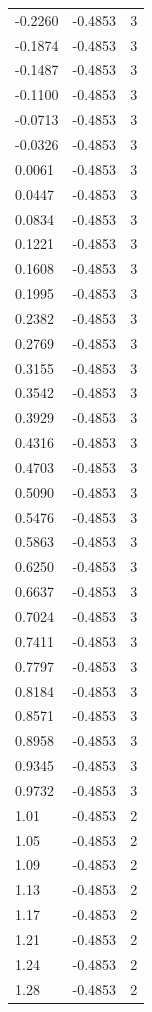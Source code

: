\begin{longtable}{lrr}
  -0.2260 & -0.4853 & 3 \\
  -0.1874 & -0.4853 & 3 \\
  -0.1487 & -0.4853 & 3 \\
  -0.1100 & -0.4853 & 3 \\
  -0.0713 & -0.4853 & 3 \\
  -0.0326 & -0.4853 & 3 \\
  0.0061 & -0.4853 & 3 \\
  0.0447 & -0.4853 & 3 \\
  0.0834 & -0.4853 & 3 \\
  0.1221 & -0.4853 & 3 \\
  0.1608 & -0.4853 & 3 \\
  0.1995 & -0.4853 & 3 \\
  0.2382 & -0.4853 & 3 \\
  0.2769 & -0.4853 & 3 \\
  0.3155 & -0.4853 & 3 \\
  0.3542 & -0.4853 & 3 \\
  0.3929 & -0.4853 & 3 \\
  0.4316 & -0.4853 & 3 \\
  0.4703 & -0.4853 & 3 \\
  0.5090 & -0.4853 & 3 \\
  0.5476 & -0.4853 & 3 \\
  0.5863 & -0.4853 & 3 \\
  0.6250 & -0.4853 & 3 \\
  0.6637 & -0.4853 & 3 \\
  0.7024 & -0.4853 & 3 \\
  0.7411 & -0.4853 & 3 \\
  0.7797 & -0.4853 & 3 \\
  0.8184 & -0.4853 & 3 \\
  0.8571 & -0.4853 & 3 \\
  0.8958 & -0.4853 & 3 \\
  0.9345 & -0.4853 & 3 \\
  0.9732 & -0.4853 & 3 \\
  1.01 & -0.4853 & 2 \\
  1.05 & -0.4853 & 2 \\
  1.09 & -0.4853 & 2 \\
  1.13 & -0.4853 & 2 \\
  1.17 & -0.4853 & 2 \\
  1.21 & -0.4853 & 2 \\
  1.24 & -0.4853 & 2 \\
  1.28 & -0.4853 & 2 \\

\end{longtable}
